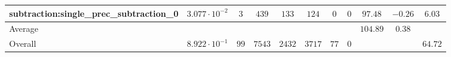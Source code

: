 \begin{tabular}{|l|c|c|c|c|c|c|c|c|c|c|}
subtraction:single\_prec\_subtraction\_0         & $ 3.077 \cdot 10^{-2} $ & $ 3      $ & $ 439  $ & $ 133  $ & $ 124   $ & $ 0  $ & $ 0 $ & $ 97.48       $ & $ -0.26   $ & $ 6.03    $ \\
\hline
Average                                          & $                     $ & $        $ & $      $ & $      $ & $       $ & $    $ & $   $ & $ 104.89      $ & $ 0.38    $ & $         $ \\
\hline
Overall                                          & $ 8.922 \cdot 10^{-1} $ & $ 99     $ & $ 7543 $ & $ 2432 $ & $ 3717  $ & $ 77 $ & $ 0 $ & $             $ & $         $ & $ 64.72   $ \\
\hline
\end{tabular}
